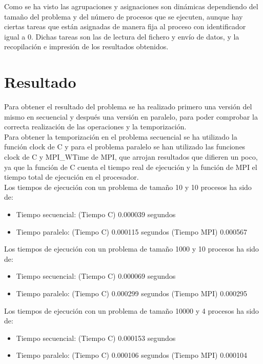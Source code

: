 \newpage \documentclass[a4paper,10pt]{article}
\begin{document}
Como se ha visto las agrupaciones y asignaciones son dinámicas dependiendo del tamaño del problema y del número de procesos que se ejecuten, aunque hay ciertas tareas que están asignadas de manera fija al proceso con identificador igual a 0. Dichas tareas son las de lectura del fichero y envío de datos, y la recopilación e impresión de los resultados obtenidos.\\

\section{Resultado}

Para obtener el resultado del problema se ha realizado primero una versión del mismo en secuencial y después una versión en paralelo, para poder comprobar la correcta realización de las operaciones y la temporización.\\

Para obtener la temporización en el problema secuencial se ha utilizado la función clock de C y para el problema paralelo se han utilizado las funciones clock de C y MPI\_WTime de MPI, que arrojan resultados que difieren un poco, ya que la función de C cuenta el tiempo real de ejecución y la función de MPI el tiempo total de ejecución en el procesador. \\

Los tiempos de ejecución con un problema de tamaño 10 y 10 procesos ha sido de:
\begin{itemize}
\item Tiempo secuencial: (Tiempo C) 0.000039 segundos
\item Tiempo paralelo:   (Tiempo C) 0.000115 segundos (Tiempo MPI) 0.000567\\
\end{itemize}

Los tiempos de ejecución con un problema de tamaño 1000 y 10 procesos ha sido de:
\begin{itemize}
\item Tiempo secuencial: (Tiempo C) 0.000069 segundos
\item Tiempo paralelo:   (Tiempo C) 0.000299 segundos (Tiempo MPI) 0.000295\\
\end{itemize}

Los tiempos de ejecución con un problema de tamaño 10000 y 4 procesos ha sido de:
\begin{itemize}
\item Tiempo secuencial: (Tiempo C) 0.000153 segundos
\item Tiempo paralelo:   (Tiempo C) 0.000106 segundos (Tiempo MPI) 0.000104\\
\end{itemize}
\end{document}
